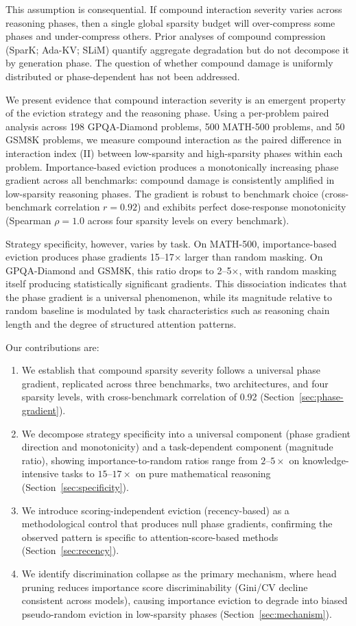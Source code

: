\documentclass[11pt,a4paper]{article}
\begin{document}
This assumption is consequential. If compound interaction severity varies across reasoning phases, then a single global sparsity budget will over-compress some phases and under-compress others. Prior analyses of compound compression (SparK; Ada-KV; SLiM) quantify aggregate degradation but do not decompose it by generation phase. The question of whether compound damage is uniformly distributed or phase-dependent has not been addressed.

We present evidence that compound interaction severity is an emergent property of the eviction strategy and the reasoning phase. Using a per-problem paired analysis across 198 GPQA-Diamond problems, 500 MATH-500 problems, and 50 GSM8K problems, we measure compound interaction as the paired difference in interaction index (II) between low-sparsity and high-sparsity phases within each problem. Importance-based eviction produces a monotonically increasing phase gradient across all benchmarks: compound damage is consistently amplified in low-sparsity reasoning phases. The gradient is robust to benchmark choice (cross-benchmark correlation $r{=}0.92$) and exhibits perfect dose-response monotonicity (Spearman $\rho{=}1.0$ across four sparsity levels on every benchmark).

Strategy specificity, however, varies by task. On MATH-500, importance-based eviction produces phase gradients 15--17$\times$ larger than random masking. On GPQA-Diamond and GSM8K, this ratio drops to 2--5$\times$, with random masking itself producing statistically significant gradients. This dissociation indicates that the phase gradient is a universal phenomenon, while its magnitude relative to random baseline is modulated by task characteristics such as reasoning chain length and the degree of structured attention patterns.

Our contributions are:
\begin{enumerate}
\item We establish that compound sparsity severity follows a universal phase gradient, replicated across three benchmarks, two architectures, and four sparsity levels, with cross-benchmark correlation of 0.92 (Section~\ref{sec:phase-gradient}).
\item We decompose strategy specificity into a universal component (phase gradient direction and monotonicity) and a task-dependent component (magnitude ratio), showing importance-to-random ratios range from $2$--$5\times$ on knowledge-intensive tasks to $15$--$17\times$ on pure mathematical reasoning (Section~\ref{sec:specificity}).
\item We introduce scoring-independent eviction (recency-based) as a methodological control that produces null phase gradients, confirming the observed pattern is specific to attention-score-based methods (Section~\ref{sec:recency}).
\item We identify discrimination collapse as the primary mechanism, where head pruning reduces importance score discriminability (Gini/CV decline consistent across models), causing importance eviction to degrade into biased pseudo-random eviction in low-sparsity phases (Section~\ref{sec:mechanism}).
\end{enumerate}
\end{document}

